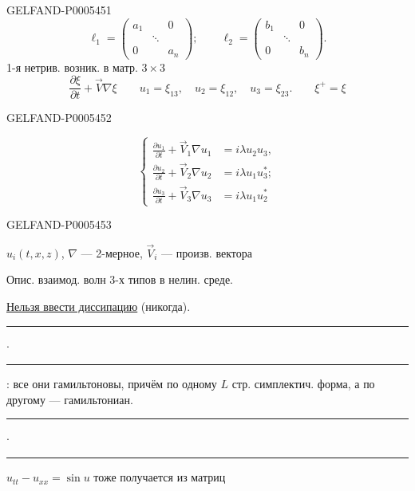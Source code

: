 \begin{GelfandAdjacentEvidence}{GELFAND-P000545}{1}
\[
\ell_1=\begin{pmatrix}a_1&&0\\&\ddots&\\0&&a_n\end{pmatrix};
\qquad
\ell_2=\begin{pmatrix}b_1&&0\\&\ddots&\\0&&b_n\end{pmatrix}.
\]
1-я нетрив. возник. в матр. \(3\times3\)
\[
\frac{\partial\xi}{\partial t}+\vec V\nabla\xi
\qquad u_1=\xi_{13},\quad u_2=\xi_{12},\quad u_3=\xi_{23}.
\qquad \xi^{+}=\xi
\]
\end{GelfandAdjacentEvidence}
\begin{GelfandAdjacentEvidence}{GELFAND-P000545}{2}

\[
\left\{\begin{aligned}
\frac{\partial u_1}{\partial t}+\vec V_1\nabla u_1&=i\lambda u_2u_3,\\
\frac{\partial u_2}{\partial t}+\vec V_2\nabla u_2&=i\lambda u_1u_3^*;\\
\frac{\partial u_3}{\partial t}+\vec V_3\nabla u_3&=i\lambda u_1u_2^*
\end{aligned}\right.
\]
\end{GelfandAdjacentEvidence}
\begin{GelfandAdjacentEvidence}{GELFAND-P000545}{3}

\(u_i(t,x,z)\), \(\nabla\) — 2-мерное, \(\vec V_i\) — произв. вектора

Опис. взаимод. волн 3-х типов в нелин. среде.

\uline{Нельзя ввести диссипацию} (никогда).
\hfill\rule{1.2cm}{.35pt}\enspace\(\cdot\)\enspace\rule{1.3cm}{.35pt}\par

: все они гамильтоновы, причём по одному \(L\) стр. симплектич. форма, а по другому — гамильтониан.
\hfill\rule{1.2cm}{.35pt}\enspace\(\cdot\)\enspace\rule{1.3cm}{.35pt}\par

\(u_{tt}-u_{xx}=\sin u\) тоже получается из матриц
\end{GelfandAdjacentEvidence}
